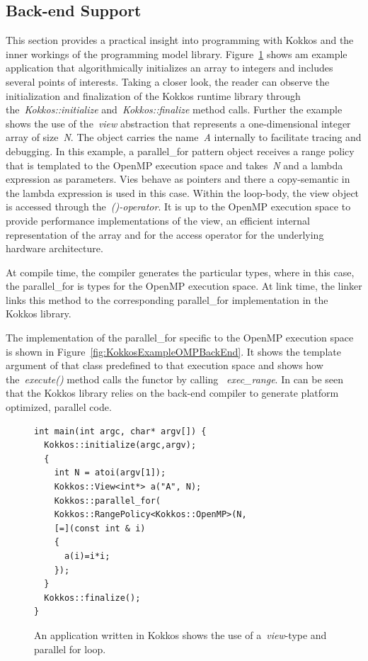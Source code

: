 \subsection{Back-end Support}\label{chap:kokkosBackend}

This section provides a practical insight into programming with Kokkos and the inner workings of the programming model library. Figure~\ref{fig:KokkosExample} shows am example application that algorithmically initializes an array to integers and includes several points of interests. Taking a closer look, the reader can observe the initialization and finalization of the Kokkos runtime library through the~\emph{Kokkos::initialize} and~\emph{Kokkos::finalize} method calls. Further the example shows the use of the~\emph{view} abstraction that represents a one-dimensional integer array of size~\emph{N}. The object carries the name~\emph{A} internally to facilitate tracing and debugging. In this example, a parallel\_for pattern object receives a range policy that is templated to the OpenMP execution space and takes~\emph{N} and a lambda expression as parameters. Vies behave as pointers and there a copy-semantic in the lambda expression is used in this case. Within the loop-body, the view object is accessed through the~\emph{()-operator}. It is up to the OpenMP execution space to provide performance implementations of the view, an efficient internal representation of the array and for the access operator for the underlying hardware architecture.

At compile time, the compiler generates the particular types, where in this case, the parallel\_for is types for the OpenMP execution space. At link time, the linker links this method to the corresponding parallel\_for implementation in the Kokkos library.

The implementation of the parallel\_for specific to the OpenMP execution space is shown in Figure~\ref{fig:KokkosExampleOMPBackEnd}. It shows the template argument of that class predefined to that execution space and shows how the~\emph{execute()} method calls the functor by calling ~\emph{exec\_range}. In can be seen that the Kokkos library relies on the back-end compiler to generate platform optimized, parallel code. 

\begin{figure}
\begin{small}
\begin{Verbatim}[frame=leftline]
int main(int argc, char* argv[]) {
  Kokkos::initialize(argc,argv);
  {
    int N = atoi(argv[1]);
    Kokkos::View<int*> a("A", N);  
    Kokkos::parallel_for(
    Kokkos::RangePolicy<Kokkos::OpenMP>(N,
    [=](const int & i)
    {
      a(i)=i*i;
    }); 
  }
  Kokkos::finalize();
}
\end{Verbatim}
\end{small}
\caption{An application written in Kokkos shows the use of a~\emph{view}-type and parallel for loop.}
\label{fig:KokkosExample}
\end{figure}




